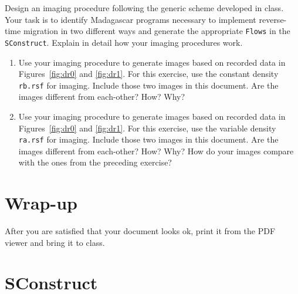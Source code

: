 Design an imaging procedure following the generic scheme developed in
class. Your task is to identify Madagascar programs necessary to
implement reverse-time migration in two different ways and generate
the appropriate \texttt{Flows} in the \texttt{SConstruct}. Explain in
detail how your imaging procedures work. 

\begin{enumerate}
\item Use your imaging procedure to generate images based on recorded
  data in Figures~\ref{fig:dr0} and \ref{fig:dr1}. For this exercise,
  use the constant density \texttt{rb.rsf} for imaging. Include those
  two images in this document. Are the images different from
  each-other? How? Why?

\item Use your imaging procedure to generate images based on recorded
  data in Figures~\ref{fig:dr0} and \ref{fig:dr1}. For this exercise,
  use the variable density \texttt{ra.rsf} for imaging. Include those
  two images in this document. Are the images different from
  each-other? How? Why? How do your images compare with the ones from
  the preceding exercise?
\end{enumerate}

\section{Wrap-up}

After you are satisfied that your document looks ok, print it from the
PDF viewer and bring it to class.

\newpage
\section{SConstruct}
\tiny

\normalsize


